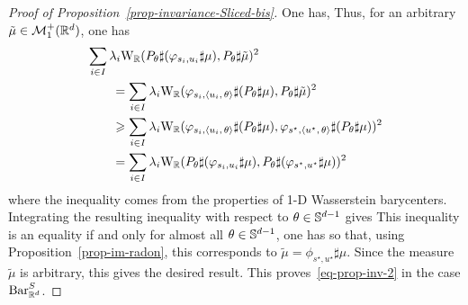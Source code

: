 \begin{proof}[Proof of Proposition~\ref{prop-invariance-Sliced-bis}]
	One has, 
	Thus, for an arbitrary $\tilde \mu \in \mathcal{M}_1^+(\mathbb{R}^d)$, one has
	\begin{align*}
		&\sum_{i\in I} \lambda_i \text{\upshape W}_{\mathbb{R}}( P_\theta \sharp (\varphi_{s_i,u_i} \sharp \mu), P_\theta \sharp \tilde\mu )^2\\
		&\qquad = \sum_{i\in I} \lambda_i \text{\upshape W}_{\mathbb{R}}( \varphi_{s_i,\langle u_i,\,\theta\rangle } \sharp (P_\theta \sharp \mu), P_\theta \sharp  \tilde\mu )^2 \\
		&\qquad  \geqslant \sum_{i\in I} \lambda_i \text{\upshape W}_{\mathbb{R}}(  \varphi_{s_i,\langle u_i,\,\theta\rangle } \sharp (P_\theta \sharp \mu), \varphi_{s^\star,\langle u^\star,\,\theta\rangle} \sharp (P_\theta \sharp \mu) )^2 \\
		&\qquad = \sum_{i\in I} \lambda_i \text{\upshape W}_{\mathbb{R}}(  P_\theta \sharp (\varphi_{s_i,u_i} \sharp \mu), P_\theta \sharp (\varphi_{s^\star,u^\star}  \sharp \mu) )^2 
	\end{align*}
	where the  inequality comes from the properties of 1-D Wasserstein barycenters. Integrating the resulting inequality with respect to $\theta \in \mathbb{S}^{d-1}$ gives
	This inequality is an equality if and only for almost all $\theta \in \mathbb{S}^{d-1}$, one has
	so that, using Proposition~\eqref{prop-im-radon}, this corresponds to $\tilde \mu = \phi_{s^\star,u^\star} \sharp \mu$.
	Since the measure $\tilde\mu$ is arbitrary, this gives the desired result. 
	This proves~\eqref{eq-prop-inv-2} in the case $\text{\upshape Bar}_{\mathbb{R}^d}^S$. 
\end{proof}
